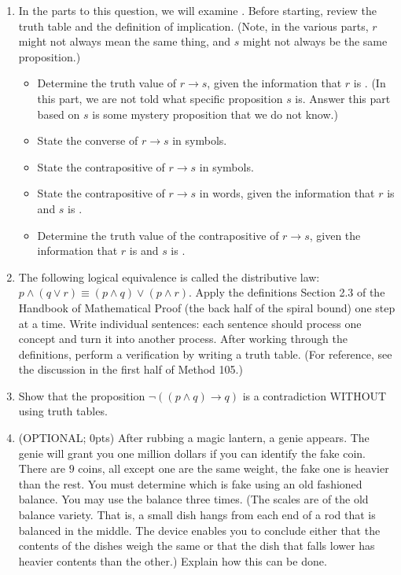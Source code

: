 \documentclass{article}
\begin{document}
\begin{enumerate}
\item In the parts to this question, we will examine . Before starting, review the truth table and the definition of implication. (Note, in the various parts, $r$ might not always mean the same thing, and $s$ might not always be the same proposition.)
\begin{itemize}
\item Determine the truth value of $r \rightarrow s$, given the information that $r$ is . (In this part, we are not told what specific proposition $s$ is. Answer this part based on $s$ is some mystery proposition that we do not know.)
\item State the converse of $r \rightarrow s$ in symbols.
\item State the contrapositive of $r \rightarrow s$ in symbols.
\item State the contrapositive of $r \rightarrow s$ in words, given the information that $r$ is  and $s$ is .
\item Determine the truth value of the contrapositive of $r \rightarrow s$, given the information that $r$ is  and $s$ is .
\end{itemize}


\item The following logical equivalence is called the distributive law: $p \wedge (q \vee r) \equiv (p \wedge q) \vee (p \wedge r)$. Apply the definitions Section 2.3 of the Handbook of Mathematical Proof (the back half of the spiral bound) one step at a time. Write individual sentences: each sentence should process one concept and turn it into another process. After working through the definitions, perform a verification by writing a truth table. (For reference, see the discussion in the first half of Method 105.)

\item Show that the proposition $\neg ( (p \wedge q) \rightarrow q)$ is a contradiction WITHOUT using truth tables.

\item (OPTIONAL; 0pts) After rubbing a magic lantern, a genie appears. The genie will grant you one million dollars if you can identify the fake coin. There are $9$ coins, all except one are the same weight, the fake one is heavier than the rest. You must determine which is fake using an old fashioned balance. You may use the balance three times. (The scales are of the old balance variety. That is, a small dish hangs from each end of a rod that is balanced in the middle. The device enables you to conclude either that the contents of the dishes weigh the same or that the dish that falls lower has heavier contents than the other.) Explain how this can be done.



\end{enumerate}
\end{document}

